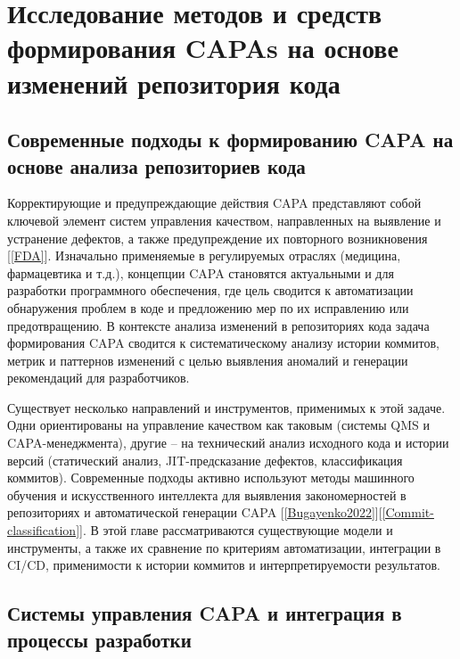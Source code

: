\chapter{Исследование методов и средств  формирования CAPAs на основе изменений репозитория кода} \label{ch1}

\section{Современные подходы к формированию CAPA на основе анализа репозиториев кода} \label{ch1:sec1}

Корректирующие и предупреждающие действия CAPA представляют собой ключевой элемент систем управления качеством, направленных на выявление и устранение дефектов, а также предупреждение их повторного возникновения [\ref{FDA}]. Изначально применяемые в регулируемых отраслях (медицина, фармацевтика и т.д.), концепции CAPA становятся актуальными и для разработки программного обеспечения, где цель сводится к автоматизации обнаружения проблем в коде и предложению мер по их исправлению или предотвращению. В контексте анализа изменений в репозиториях кода задача формирования CAPA сводится к систематическому анализу истории коммитов, метрик и паттернов изменений с целью выявления аномалий и генерации рекомендаций для разработчиков.

Существует несколько направлений и инструментов, применимых к этой задаче. Одни ориентированы на управление качеством как таковым (системы QMS и CAPA-менеджмента), другие – на технический анализ исходного кода и истории версий (статический анализ, JIT-предсказание дефектов, классификация коммитов). Современные подходы активно используют методы машинного обучения и искусственного интеллекта для выявления закономерностей в репозиториях и автоматической генерации CAPA [\ref{Bugayenko2022}][\ref{Commit-classification}]. В этой главе рассматриваются существующие модели и инструменты, а также их сравнение по критериям автоматизации, интеграции в CI/CD, применимости к истории коммитов и интерпретируемости результатов.

\section{Системы управления CAPA и интеграция в процессы разработки} \label{ch1:sec2}

